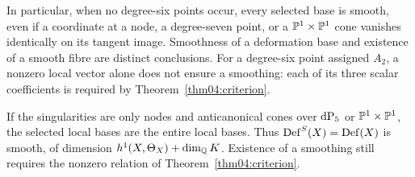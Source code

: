 In particular, when no degree-six points occur, every selected base
is smooth, even if a coordinate at a node, a degree-seven point,
or a $\mathbb{P}^1\times\mathbb{P}^1$ cone vanishes
identically on its tangent image.  Smoothness of a deformation base
and existence of a smooth fibre are distinct conclusions.  For a
degree-six point assigned $A_2$, a nonzero local vector alone does
not ensure a smoothing: each of its three scalar coefficients is
required by Theorem~\ref{thm04:criterion}.

If the singularities are only nodes and anticanonical cones over
$\mathrm{dP}_5$ or $\mathbb{P}^1\times\mathbb{P}^1$, the selected local bases are the entire
local bases.  Thus $\operatorname{Def}^S(X)=\operatorname{Def}(X)$ is smooth, of dimension
$h^1(X,\Theta_X)+\dim_{\mathbb{Q}} K$.  Existence of a smoothing still
requires the nonzero relation of Theorem~\ref{thm04:criterion}.
